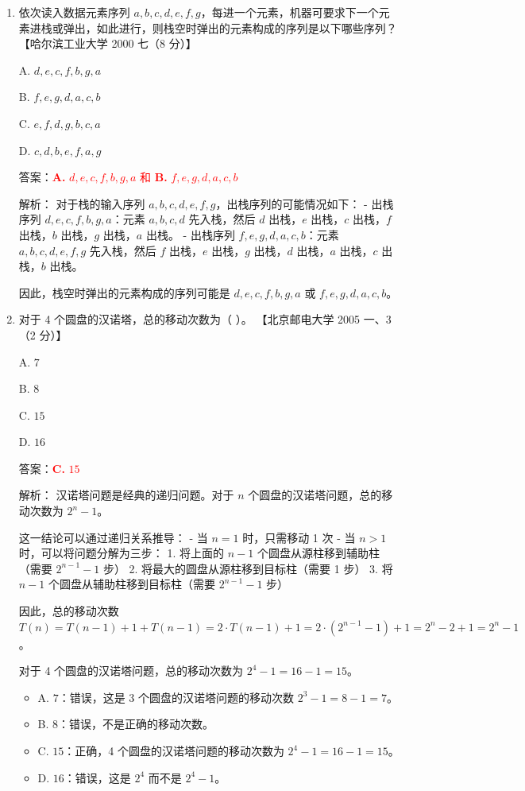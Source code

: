 \documentclass[lang=cn,newtx,10pt,scheme=chinese]{../../../elegantbook}
\begin{document}
\begin{enumerate}
    \item 依次读入数据元素序列 $a, b, c, d, e,f,g$，每进一个元素，机器可要求下一个元素进栈或弹出，如此进行，则栈空时弹出的元素构成的序列是以下哪些序列？  
    【哈尔滨工业大学 2000 七（8 分）】 

    A. $d,e,c,f,b,g,a$  

    B. $f,e,g,d,a,c,b$  

    C. $e, f,d, g,b, c, a$  

    D. $c, d, b,e,f,a,g$  

    答案：\textcolor{red}{\textbf{A.} $d,e,c,f,b,g,a$ 和 \textbf{B.} $f,e,g,d,a,c,b$}

    解析：
    对于栈的输入序列 $a, b, c, d, e, f, g$，出栈序列的可能情况如下：
    - 出栈序列 $d, e, c, f, b, g, a$：元素 $a, b, c, d$ 先入栈，然后 $d$ 出栈，$e$ 出栈，$c$ 出栈，$f$ 出栈，$b$ 出栈，$g$ 出栈，$a$ 出栈。
    - 出栈序列 $f, e, g, d, a, c, b$：元素 $a, b, c, d, e, f, g$ 先入栈，然后 $f$ 出栈，$e$ 出栈，$g$ 出栈，$d$ 出栈，$a$ 出栈，$c$ 出栈，$b$ 出栈。

    因此，栈空时弹出的元素构成的序列可能是 $d, e, c, f, b, g, a$ 或 $f, e, g, d, a, c, b$。

    \item 对于 4 个圆盘的汉诺塔，总的移动次数为（ ）。  
    【北京邮电大学 2005 一、3（2 分）】  

    A. $7$  

    B. $8$  

    C. $15$  

    D. $16$  

    答案：\textcolor{red}{\textbf{C.} $15$}

    解析：
    汉诺塔问题是经典的递归问题。对于 $n$ 个圆盘的汉诺塔问题，总的移动次数为 $2^n - 1$。
    
    这一结论可以通过递归关系推导：
    - 当 $n = 1$ 时，只需移动 1 次
    - 当 $n > 1$ 时，可以将问题分解为三步：
      1. 将上面的 $n-1$ 个圆盘从源柱移到辅助柱（需要 $2^{n-1} - 1$ 步）
      2. 将最大的圆盘从源柱移到目标柱（需要 1 步）
      3. 将 $n-1$ 个圆盘从辅助柱移到目标柱（需要 $2^{n-1} - 1$ 步）
    
    因此，总的移动次数 $T(n) = T(n-1) + 1 + T(n-1) = 2 \cdot T(n-1) + 1 = 2 \cdot (2^{n-1} - 1) + 1 = 2^n - 2 + 1 = 2^n - 1$。
    
    对于 4 个圆盘的汉诺塔问题，总的移动次数为 $2^4 - 1 = 16 - 1 = 15$。

    \begin{itemize}
        \item A. $7$：错误，这是 3 个圆盘的汉诺塔问题的移动次数 $2^3 - 1 = 8 - 1 = 7$。
        \item B. $8$：错误，不是正确的移动次数。
        \item C. $15$：正确，4 个圆盘的汉诺塔问题的移动次数为 $2^4 - 1 = 16 - 1 = 15$。
        \item D. $16$：错误，这是 $2^4$ 而不是 $2^4 - 1$。
    \end{itemize}


\end{enumerate}
\end{document}
